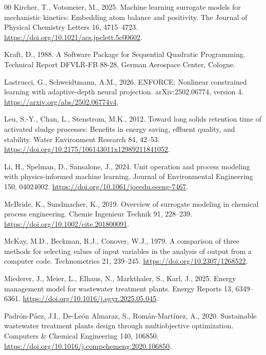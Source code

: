 \documentclass[a4paper,fleqn]{cas-sc}
\begin{document}
\begin{thebibliography}{00}
Kircher, T., Votsmeier, M., 2025. Machine learning surrogate models for mechanistic kinetics: Embedding atom balance and positivity. The Journal of Physical Chemistry Letters 16, 4715--4723. \url{https://doi.org/10.1021/acs.jpclett.5c00602}.

Kraft, D., 1988. A Software Package for Sequential Quadratic Programming. Technical Report DFVLR-FB 88-28, German Aerospace Center, Cologne.

Lastrucci, G., Schweidtmann, A.M., 2026. ENFORCE: Nonlinear constrained learning with adaptive-depth neural projection. arXiv:2502.06774, version 4. \url{https://arxiv.org/abs/2502.06774v4}.

Leu, S.-Y., Chan, L., Stenstrom, M.K., 2012. Toward long solids retention time of activated sludge processes: Benefits in energy saving, effluent quality, and stability. Water Environment Research 84, 42--53. \url{https://doi.org/10.2175/106143011x12989211841052}.

Li, H., Spelman, D., Sansalone, J., 2024. Unit operation and process modeling with physics-informed machine learning. Journal of Environmental Engineering 150, 04024002. \url{https://doi.org/10.1061/joeedu.eeeng-7467}.

McBride, K., Sundmacher, K., 2019. Overview of surrogate modeling in chemical process engineering. Chemie Ingenieur Technik 91, 228--239. \url{https://doi.org/10.1002/cite.201800091}.

McKay, M.D., Beckman, R.J., Conover, W.J., 1979. A comparison of three methods for selecting values of input variables in the analysis of output from a computer code. Technometrics 21, 239--245. \url{https://doi.org/10.2307/1268522}.

Miederer, J., Meier, L., Elhaus, N., Markthaler, S., Karl, J., 2025. Energy management model for wastewater treatment plants. Energy Reports 13, 6349--6361. \url{https://doi.org/10.1016/j.egyr.2025.05.045}.

Padr\'on-P\'aez, J.I., De-Le\'on Almaraz, S., Rom\'an-Mart\'inez, A., 2020. Sustainable wastewater treatment plants design through multiobjective optimization. Computers \& Chemical Engineering 140, 106850. \url{https://doi.org/10.1016/j.compchemeng.2020.106850}.


\end{thebibliography}
\end{document}
